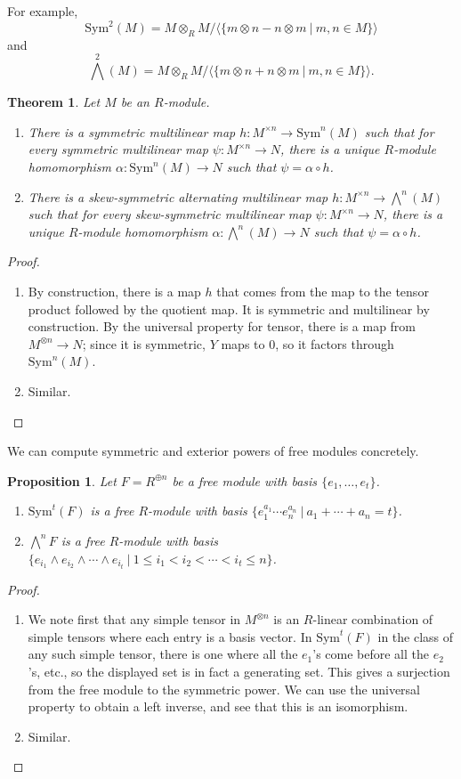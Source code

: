 \documentclass{amsart}[12pt]
\numberwithin{equation}{section}
\theoremstyle{plain} %
\newtheorem{thm}[equation]{Theorem}
\newtheorem{prop}[equation]{Proposition}
\theoremstyle{definition}
\theoremstyle{remark}
\begin{document}
For example, \[\mathrm{Sym}^2(M) = M\otimes_R M / \langle \{m\otimes n - n\otimes m \ | \ m,n\in M\}\rangle\] and \[\bigwedge^2(M) = M\otimes_R M / \langle \{m\otimes n + n\otimes m \ | \ m,n\in M\}\rangle.\]

\begin{thm} Let $M$ be an $R$-module.
\begin{enumerate}
\item
 There is a symmetric multilinear map $h:M^{\times n} \to \mathrm{Sym}^n(M)$ such that for every symmetric multilinear map $\psi: M^{\times n} \to N$, there is a unique $R$-module homomorphism $\alpha:\mathrm{Sym}^n(M) \to N$ such that $\psi=\alpha\circ h$.
 \item
 There is a skew-symmetric alternating multilinear map $h:M^{\times n} \to \bigwedge^n(M)$ such that for every skew-symmetric multilinear map $\psi: M^{\times n} \to N$, there is a unique $R$-module homomorphism ${\alpha:\bigwedge^n(M) \to N}$ such that $\psi=\alpha\circ h$.
 \end{enumerate}
 \end{thm}
\begin{proof}
\begin{enumerate}
\item By construction, there is a map $h$ that comes from the map to the tensor product followed by the quotient map. It is symmetric and multilinear by construction. By the universal property for tensor, there is a map from $M^{\otimes n} \to N$; since it is symmetric, $Y$ maps to $0$, so it factors through $\mathrm{Sym}^n(M)$.
\item Similar.\qedhere
\end{enumerate}
\end{proof}

We can compute symmetric and exterior powers of free modules concretely.

\begin{prop} Let $F= R^{\oplus n}$ be a free module with basis $\{e_1,\dots,e_t\}$.
\begin{enumerate}
\item $\mathrm{Sym}^t(F)$ is a free $R$-module with basis $\{ e_1^{a_1} \cdots e_n^{a_n} \ | \ a_1+\cdots+a_n=t\}$.
\item $\bigwedge ^n F$ is a free $R$-module with basis $\{ e_{i_1} \wedge e_{i_2} \wedge\cdots \wedge e_{i_t} \ | \ 1\leq i_1 < i_2 <\cdots < i_t \leq n\}$.
\end{enumerate}
\end{prop}
\begin{proof}
\begin{enumerate}
\item We note first that any simple tensor in $M^{\otimes n}$ is an $R$-linear combination of simple tensors where each entry is a basis vector. In $\mathrm{Sym}^t(F)$ in the class of any such simple tensor, there is one where all the $e_1$'s come before all the $e_2$'s, etc., so the displayed set is in fact a generating set. This gives a surjection from the free module to the symmetric power. We can use the universal property to obtain a left inverse, and see that this is an isomorphism.
\item Similar.
\end{enumerate}
\end{proof}
\end{document}
